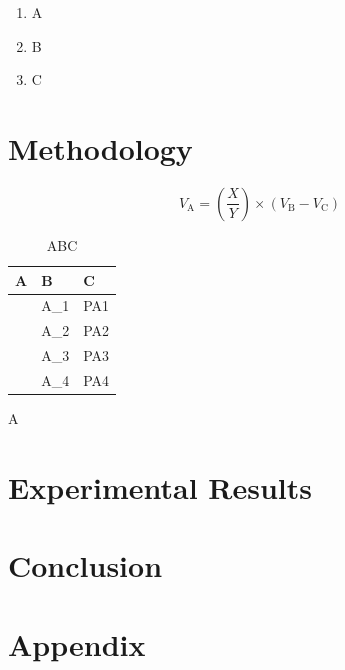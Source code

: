 \documentclass{article}
\begin{document}
\begin{enumerate}
\def\labelenumi{\arabic{enumi}.}
\item
  A
\item
  B
\item
  C
\end{enumerate}



\chapter{Methodology}\label{methodology}

\begin{equation}
  V_{\text{A}} = \left(\frac{X}{Y}\right) \times (V_{\text{B}} - V_{\text{C}})
  \label{VoutZoom}
\end{equation}

\begin{table}[!htb]
  \centering
  \begin{tabular}{p{2.5cm} p{6cm} p{2.5cm}}
    \toprule
    \textbf{A} & \textbf{B} & \textbf{C} \\
    \midrule
    & A\_1 & PA1 \\
    & A\_2 & PA2 \\
    & A\_3 & PA3 \\
    & A\_4 & PA4 \\
    \bottomrule
  \end{tabular}
  \caption{ABC}
  \label{tab:abc}
\end{table}

\begin{algorithm}[!htb]
	\caption{Pseudocode for Program}
	\begin{algorithmic}[1] %
		\STATE A
	\end{algorithmic}
\end{algorithm}



\chapter{Experimental Results}\label{experimental-results}



\chapter{Conclusion}\label{conclusion}


\chapter{Appendix} \label{Chapter:Appendix}
\end{document}
